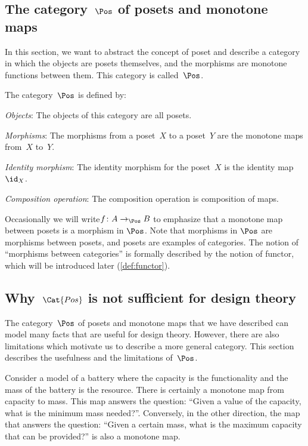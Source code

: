 \subsection{The category~$\Pos$ of posets and monotone maps}
In this section, we want to abstract the concept of poset and describe a category in which the objects are posets themselves, and the morphisms are monotone functions between them. This category is called~$\Pos$.

\begin{definition}
    The category~$\Pos$ is defined by:
    \begin{compactenum}
    \item \emph{Objects}: The objects of this category are all posets.
    \item \emph{Morphisms}: The morphisms from a poset~$X$ to a poset~$Y$ are the monotone maps from~$X$ to~$Y$.
    \item \emph{Identity morphism}:  The identity morphism for the poset~$X$
    is the identity map~$\id_X$.
    \item \emph{Composition operation}: The composition operation is composition of maps.
    \end{compactenum}
\end{definition}

Occasionally we will write$f \colon A \to_{\Pos} B$ to emphasize that a monotone map between posets is a morphism in $\Pos$. Note that morphisms in $\Pos$ are morphisms between posets, and posets are examples of categories. The notion of ``morphisms between categories'' is formally described by the notion of functor, which will be introduced later (\cref{def:functor}).

\subsection{Why~$\Cat{Pos}$ is not sufficient for design theory}

The category~$\Pos$ of posets and monotone maps that we have described can model many facts that are useful for design theory. However, there are also limitations which motivate us to describe a more general category. This section describes the usefulness and the limitations of~$\Pos$.

\begin{example}[Battery]
Consider a model of a battery where the capacity is the functionality and the mass of the battery is the resource.
There is certainly a monotone map from capacity to mass. This map answers the question: ``Given a value of the capacity, what is the minimum mass needed?''. Conversely, in the other direction, the map that answers the question: ``Given a certain mass, what is the maximum capacity that can be provided?'' is also a monotone map.
\end{example}

